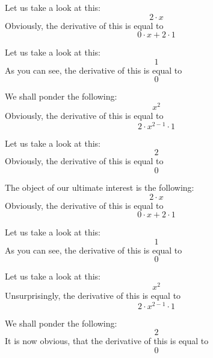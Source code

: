 \documentclass{article}
\begin{document}
Let us take a look at this:
\begin{equation}
2 \cdot x 
\end{equation}
Obviously, the derivative of this is equal to
\begin{equation}
0 \cdot x + 2 \cdot 1 
\end{equation}

Let us take a look at this:
\begin{equation}
1 
\end{equation}
As you can see, the derivative of this is equal to
\begin{equation}
0 
\end{equation}

We shall ponder the following:
\begin{equation}
x ^{2 } 
\end{equation}
Obviously, the derivative of this is equal to
\begin{equation}
2 \cdot x ^{2 - 1 } \cdot 1 
\end{equation}

Let us take a look at this:
\begin{equation}
2 
\end{equation}
Obviously, the derivative of this is equal to
\begin{equation}
0 
\end{equation}

The object of our ultimate interest is the following:
\begin{equation}
2 \cdot x 
\end{equation}
Obviously, the derivative of this is equal to
\begin{equation}
0 \cdot x + 2 \cdot 1 
\end{equation}

Let us take a look at this:
\begin{equation}
1 
\end{equation}
As you can see, the derivative of this is equal to
\begin{equation}
0 
\end{equation}

Let us take a look at this:
\begin{equation}
x ^{2 } 
\end{equation}
Unsurprisingly, the derivative of this is equal to
\begin{equation}
2 \cdot x ^{2 - 1 } \cdot 1 
\end{equation}

We shall ponder the following:
\begin{equation}
2 
\end{equation}
It is now obvious, that the derivative of this is equal to
\begin{equation}
0 
\end{equation}
\end{document}
